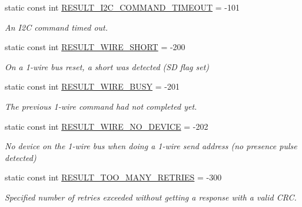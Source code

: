 \begin{DoxyCompactItemize}
static const int \mbox{\hyperlink{class_d_s2482_command_a99ae8c5d50b7e7564cc2461bb96984d9}{R\+E\+S\+U\+L\+T\+\_\+\+I2\+C\+\_\+\+C\+O\+M\+M\+A\+N\+D\+\_\+\+T\+I\+M\+E\+O\+UT}} = -\/101
\begin{DoxyCompactList}\small\item\em An I2C command timed out. \end{DoxyCompactList}\item 
\mbox{\label{class_d_s2482_command_a68f67a7645f16cdb8a4c88eeda6c711c}} 
static const int \mbox{\hyperlink{class_d_s2482_command_a68f67a7645f16cdb8a4c88eeda6c711c}{R\+E\+S\+U\+L\+T\+\_\+W\+I\+R\+E\+\_\+\+S\+H\+O\+RT}} = -\/200
\begin{DoxyCompactList}\small\item\em On a 1-\/wire bus reset, a short was detected (SD flag set) \end{DoxyCompactList}\item 
\mbox{\label{class_d_s2482_command_ad0e7e2dd735bcca35f08f221d0deb9fd}} 
static const int \mbox{\hyperlink{class_d_s2482_command_ad0e7e2dd735bcca35f08f221d0deb9fd}{R\+E\+S\+U\+L\+T\+\_\+W\+I\+R\+E\+\_\+\+B\+U\+SY}} = -\/201
\begin{DoxyCompactList}\small\item\em The previous 1-\/wire command had not completed yet. \end{DoxyCompactList}\item 
\mbox{\label{class_d_s2482_command_a9245acf172ffaa7c956e4de5d405c7e8}} 
static const int \mbox{\hyperlink{class_d_s2482_command_a9245acf172ffaa7c956e4de5d405c7e8}{R\+E\+S\+U\+L\+T\+\_\+W\+I\+R\+E\+\_\+\+N\+O\+\_\+\+D\+E\+V\+I\+CE}} = -\/202
\begin{DoxyCompactList}\small\item\em No device on the 1-\/wire bus when doing a 1-\/wire send address (no presence pulse detected) \end{DoxyCompactList}\item 
\mbox{\label{class_d_s2482_command_aa1d0b42dd911092678874aa976f4830f}} 
static const int \mbox{\hyperlink{class_d_s2482_command_aa1d0b42dd911092678874aa976f4830f}{R\+E\+S\+U\+L\+T\+\_\+\+T\+O\+O\+\_\+\+M\+A\+N\+Y\+\_\+\+R\+E\+T\+R\+I\+ES}} = -\/300
\begin{DoxyCompactList}\small\item\em Specified number of retries exceeded without getting a response with a valid C\+RC. \end{DoxyCompactList}\item 

\end{DoxyCompactItemize}
